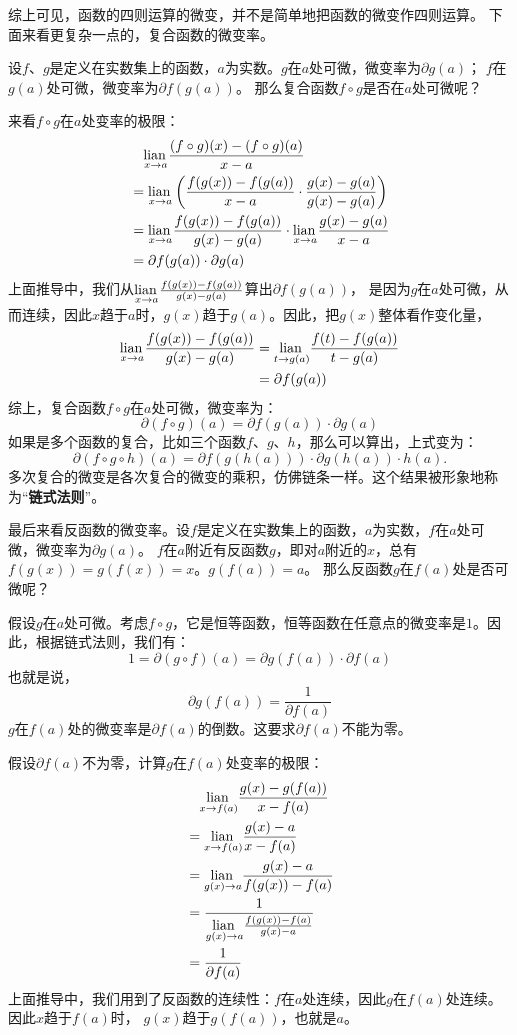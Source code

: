 \documentclass[12pt,UTF8,fontset=none]{ctexbook}
\begin{document}
综上可见，函数的四则运算的微变，并不是简单地把函数的微变作四则运算。
下面来看更复杂一点的，复合函数的微变率。

设$f$、$g$是定义在实数集上的函数，$a$为实数。$g$在$a$处可微，微变率为$\partial g(a)$；
$f$在$g(a)$处可微，微变率为$\partial f(g(a))$。
那么复合函数$f\circ g$是否在$a$处可微呢？

来看$f\circ g$在$a$处变率的极限：
\begin{align*}
    & \quad \underset{x\to a}{\operatorname{lian}\,} \frac{(f \circ g)(x) - (f \circ g)(a)}{x - a}  \\
    &= \underset{x\to a}{\operatorname{lian}\,} \left(\frac{f(g(x)) - f(g(a))}{x - a} \cdot \frac{g(x) - g(a)}{g(x) - g(a)}\right)  \\
    &= \underset{x\to a}{\operatorname{lian}\,} \frac{f(g(x)) - f(g(a))}{g(x) - g(a)} \cdot \underset{x\to a}{\operatorname{lian}\,} \frac{g(x) - g(a)}{x - a}  \\
    &= \partial f(g(a)) \cdot \partial g(a)  
\end{align*}
上面推导中，我们从$\underset{x\to a}{\operatorname{lian}\,} \frac{f(g(x)) - f(g(a))}{g(x) - g(a)}$算出$\partial f(g(a))$，
是因为$g$在$a$处可微，从而连续，因此$x$趋于$a$时，$g(x)$趋于$g(a)$。因此，把$g(x)$整体看作变化量，
\begin{align*}
    \underset{x\to a}{\operatorname{lian}\,} \frac{f(g(x)) - f(g(a))}{g(x) - g(a)} &= \underset{t\to g(a)}{\operatorname{lian}\,} \frac{f(t) - f(g(a))}{t - g(a)}  \\
    &= \partial f(g(a))  
\end{align*}
综上，复合函数$f\circ g$在$a$处可微，微变率为：
$$ \partial (f\circ g) (a) = \partial f(g(a)) \cdot \partial g(a)$$
如果是多个函数的复合，比如三个函数$f$、$g$、$h$，那么可以算出，上式变为：
$$ \partial (f\circ g \circ h) (a) = \partial f(g(h(a))) \cdot \partial g(h(a)) \cdot h(a).$$
多次复合的微变是各次复合的微变的乘积，仿佛链条一样。这个结果被形象地称为“\textbf{链式法则}”。

最后来看反函数的微变率。设$f$是定义在实数集上的函数，$a$为实数，$f$在$a$处可微，微变率为$\partial g(a)$。
$f$在$a$附近有反函数$g$，即对$a$附近的$x$，总有$f(g(x)) = g(f(x)) = x$。$g(f(a)) = a$。
那么反函数$g$在$f(a)$处是否可微呢？

假设$g$在$a$处可微。考虑$f\circ g$，它是恒等函数，恒等函数在任意点的微变率是$1$。因此，根据链式法则，我们有：
$$ 1 = \partial (g\circ f) (a) = \partial g(f(a)) \cdot \partial f(a)$$
也就是说，
$$ \partial g(f(a)) = \frac{1}{\partial f(a)} $$
$g$在$f(a)$处的微变率是$\partial f(a)$的倒数。这要求$\partial f(a)$不能为零。

假设$\partial f(a)$不为零，计算$g$在$f(a)$处变率的极限：
\begin{align*}
    & \quad \underset{x\to f(a)}{\operatorname{lian}\,} \frac{g(x) - g(f(a))}{x - f(a)}  \\
    &= \underset{x\to f(a)}{\operatorname{lian}\,} \frac{g(x) - a}{x - f(a)}  \\
    &= \underset{g(x)\to a}{\operatorname{lian}\,} \frac{g(x) - a}{f(g(x)) - f(a)}  \\
    &= \frac{1}{\underset{g(x)\to a}{\operatorname{lian}\,}\frac{f(g(x)) - f(a)}{g(x) - a}}  \\
    &= \frac{1}{\partial f(a)} 
\end{align*}
上面推导中，我们用到了反函数的连续性：$f$在$a$处连续，因此$g$在$f(a)$处连续。因此$x$趋于$f(a)$时，
$g(x)$趋于$g(f(a))$，也就是$a$。
\end{document}
